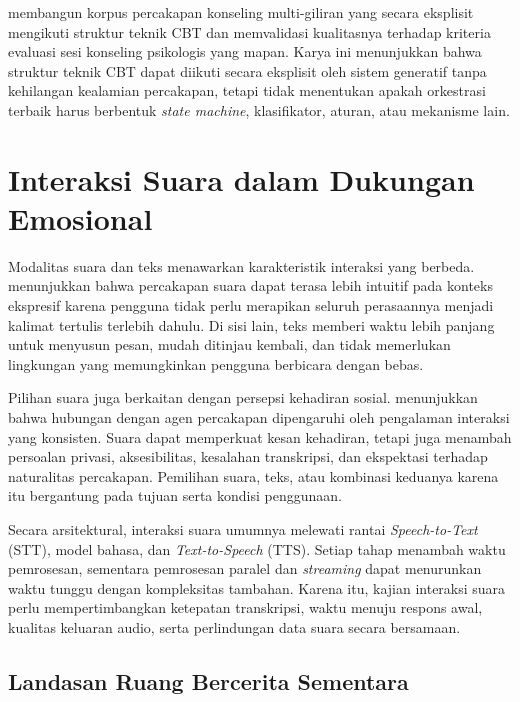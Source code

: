 \textcite{lee2024cactus} membangun korpus percakapan konseling multi-giliran yang secara eksplisit mengikuti struktur teknik CBT dan memvalidasi kualitasnya terhadap kriteria evaluasi sesi konseling psikologis yang mapan. Karya ini menunjukkan bahwa struktur teknik CBT dapat diikuti secara eksplisit oleh sistem generatif tanpa kehilangan kealamian percakapan, tetapi tidak menentukan apakah orkestrasi terbaik harus berbentuk \textit{state machine}, klasifikator, aturan, atau mekanisme lain.

\section{Interaksi Suara dalam Dukungan Emosional}
\label{sec:interaksi-suara}

Modalitas suara dan teks menawarkan karakteristik interaksi yang berbeda. \textcite{pradhan2020} menunjukkan bahwa percakapan suara dapat terasa lebih intuitif pada konteks ekspresif karena pengguna tidak perlu merapikan seluruh perasaannya menjadi kalimat tertulis terlebih dahulu. Di sisi lain, teks memberi waktu lebih panjang untuk menyusun pesan, mudah ditinjau kembali, dan tidak memerlukan lingkungan yang memungkinkan pengguna berbicara dengan bebas.

Pilihan suara juga berkaitan dengan persepsi kehadiran sosial. \textcite{bickmorePicard2005} menunjukkan bahwa hubungan dengan agen percakapan dipengaruhi oleh pengalaman interaksi yang konsisten. Suara dapat memperkuat kesan kehadiran, tetapi juga menambah persoalan privasi, aksesibilitas, kesalahan transkripsi, dan ekspektasi terhadap naturalitas percakapan. Pemilihan suara, teks, atau kombinasi keduanya karena itu bergantung pada tujuan serta kondisi penggunaan.

Secara arsitektural, interaksi suara umumnya melewati rantai \textit{Speech-to-Text} (STT), model bahasa, dan \textit{Text-to-Speech} (TTS). Setiap tahap menambah waktu pemrosesan, sementara pemrosesan paralel dan \textit{streaming} dapat menurunkan waktu tunggu dengan kompleksitas tambahan. Karena itu, kajian interaksi suara perlu mempertimbangkan ketepatan transkripsi, waktu menuju respons awal, kualitas keluaran audio, serta perlindungan data suara secara bersamaan.

\subsection{Landasan Ruang Bercerita Sementara}
\label{subsec:landasan-confession-space}

